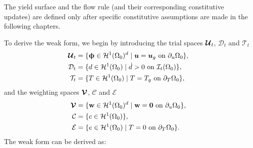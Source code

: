 The yield surface and the flow rule (and their corresponding constitutive updates) are defined only after specific constitutive assumptions are made in the following chapters.

To derive the weak form, we begin by introducing the trial spaces $\boldsymbol{\mathcal{U}}_t$, $\mathcal{D}_t$ and $\mathcal{T}_t$
\begin{subequations}
\begin{align}
  \boldsymbol{\mathcal{U}}_t &= \{ \boldsymbol{\upphi} \in \mathcal{H}^1(\Omega_0)^d \mid \boldsymbol{u} = \boldsymbol{u}_g \text{ on } \partial_u\Omega_0 \}, \\
  \mathcal{D}_t &= \{ d \in \mathcal{H}^1(\Omega_0) \mid \dot{d} > 0 \text{ on } \mathcal{I}_t(\Omega_0) \}, \\
  \mathcal{T}_t &= \{ T \in \mathcal{H}^1(\Omega_0) \mid T = T_g \text{ on } \partial_T\Omega_0 \},
\end{align}
\end{subequations}
and the weighting spaces $\boldsymbol{\mathcal{V}}$, $\mathcal{C}$ and $\mathcal{E}$
\begin{subequations}
\begin{align}
  \boldsymbol{\mathcal{V}} &= \{ \textbf{w} \in \mathcal{H}^1(\Omega_0)^d \mid \textbf{w} = \boldsymbol{0} \text{ on } \partial_u\Omega_0 \}, \\
  \mathcal{C} &= \{ c \in \mathcal{H}^1(\Omega_0) \}, \\
  \mathcal{E} &= \{ e \in \mathcal{H}^1(\Omega_0) \mid T = 0 \text{ on } \partial_T\Omega_0 \}.
\end{align}
\end{subequations}
The weak form can be derived as:
